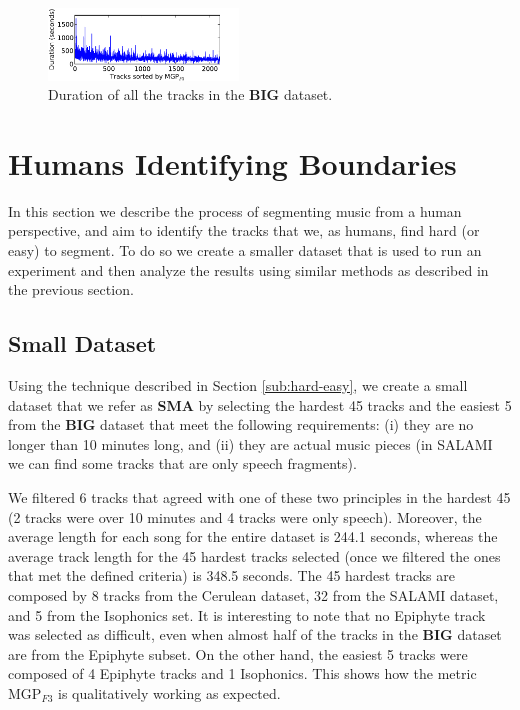 \documentclass{article}
\begin{document}
\begin{figure}
  \centering
  \includegraphics[width=0.45\textwidth, height=0.13\textheight]{plots/machines-duration.pdf}
  \caption{Duration of all the tracks in the \textbf{BIG} dataset.}
  \label{fig:machinesdur}
\end{figure}%


\section{Humans Identifying Boundaries}\label{sec:using_method}

In this section we describe the process of segmenting music from a human perspective, and aim to identify the tracks that we, as humans, find hard (or easy) to segment. 
To do so we create a smaller dataset that is used to run an experiment and then analyze the results using similar methods as described in the previous section.

\subsection{Small Dataset}

Using the technique described in Section \ref{sub:hard-easy}, we create a small dataset that we refer as \textbf{SMA} by selecting the hardest 45 tracks and the easiest 5 from the \textbf{BIG} dataset that meet the following requirements: (i) they are no longer than 10 minutes long, and (ii) they are actual music pieces (in SALAMI we can find some tracks that are only speech fragments).

We filtered 6 tracks that agreed with one of these two principles in the hardest 45 (2 tracks were over 10 minutes and 4 tracks were only speech). 
Moreover, the average length for each song for the entire dataset is 244.1 seconds, whereas the average track length for the 45 hardest tracks selected (once we filtered the ones that met the defined criteria) is 348.5 seconds.
The 45 hardest tracks are composed by 8 tracks from the Cerulean dataset, 32 from the SALAMI dataset, and 5 from the Isophonics set.
It is interesting to note that no Epiphyte track was selected as difficult, even when almost half of the tracks in the \textbf{BIG} dataset are from the Epiphyte subset.
On the other hand, the easiest 5 tracks were composed of 4 Epiphyte tracks and 1 Isophonics.
This shows how the metric MGP$_{F3}$ is qualitatively working as expected.
\end{document}

